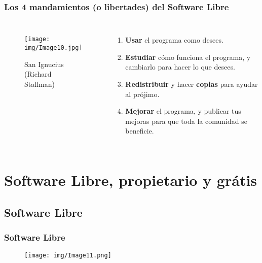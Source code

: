 \documentclass{beamer}
\begin{document}
\begin{frame}
  \frametitle{Los 4 mandamientos (o libertades) del Software Libre}
  \begin{columns}
    \begin{figure}[H]
      \centering
      \texttt{[image: img/Image10.jpg]}
      \caption{San Ignucius (Richard Stallman)}
    \end{figure}

    \begin{enumerate}[start=0]
      \item \textbf{Usar} el programa como desees.
      \item \textbf{Estudiar} cómo funciona el programa, y cambiarlo para hacer lo que desees.
      \item \textbf{Redistribuir} y hacer \textbf{copias} para ayudar al prójimo.
      \item \textbf{Mejorar} el programa, y publicar tus mejoras para que toda la comunidad se beneficie.
    \end{enumerate}
  \end{columns}
\end{frame}

\AtBeginSection[]
{
  \begin{frame}
    \tableofcontents[sectionstyle=show/shaded,subsectionstyle=show/shaded/hide,sectionstyle=show/shaded/hide]
  \end{frame}
}
\section{Software Libre, propietario y grátis}


\AtBeginSubsection[]
{
  \begin{frame}
    \tableofcontents[sectionstyle=show/shaded,subsectionstyle=show/shaded/hide,subsectionstyle=show/shaded/hide]
  \end{frame}
}

\subsection{Software Libre}


\begin{frame}
  \frametitle{Software Libre}
  \centering
  \begin{figure}[H]
    \centering
    \texttt{[image: img/Image11.png]}
  \end{figure}
\end{frame}
\end{document}
